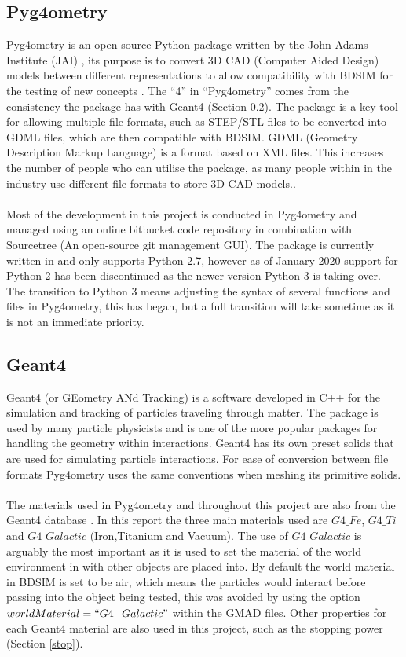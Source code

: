 \documentclass[12pt,a4paper]{article}
\begin{document}
\subsection{Pyg4ometry}
\label{pyg}
Pyg4ometry is an open-source Python package  written by the John Adams Institute (JAI) \cite{jai}, its purpose is to convert 3D CAD (Computer Aided Design) models between different representations to allow compatibility with BDSIM for the testing of new concepts \cite{pyg4om}. The ``4'' in ``Pyg4ometry'' comes from the consistency the package has with Geant4 (Section \ref{geant4}). The package is a key tool for allowing multiple file formats, such as STEP/STL files to be converted into GDML files, which are then compatible with BDSIM. GDML (Geometry Description Markup Language) is a format based on XML files. This increases the number of people who can utilise the package, as many people within in the industry use different file formats to store 3D CAD models..
\\\\
Most of the development in this project is conducted in Pyg4ometry and managed using an online bitbucket code repository \cite{bitb} in combination with Sourcetree \cite{st} (An open-source git management GUI). The package is currently written in and only supports Python 2.7, however as of January 2020 support for Python 2 has been discontinued as the newer version Python 3 is taking over. The transition to Python 3 means adjusting the syntax of several functions and files in Pyg4ometry, this has began, but a full transition will take sometime as it is not an immediate priority. 

\subsection{Geant4}\label{geant4}
\label{g4}
Geant4 (or GEometry ANd Tracking) is a software developed in C++ for the simulation and tracking of particles traveling through matter. The package is used by many particle physicists and is one of the more popular packages for handling the geometry within interactions. Geant4 has its own preset solids that are used for simulating particle interactions. For ease of conversion between file formats Pyg4ometry uses the same conventions when meshing its primitive solids.
\\\\
The materials used in Pyg4ometry and throughout this project are also from the Geant4 database \cite{mater}. In this report the three main materials used are $G4\_Fe$, $G4\_Ti$ and $G4\_Galactic$ (Iron,Titanium and Vacuum). The use of $G4\_Galactic$ is arguably the most important as it is used to set the material of the world environment in with other objects are placed into. By default the world material in BDSIM is set to be air, which means the particles would interact before passing into the object being tested, this was avoided by using the option $worldMaterial=``G4\_Galactic"$ within the GMAD files. Other properties for each Geant4 material are also used in this project, such as the stopping power (Section \ref{stop}).
\end{document}
